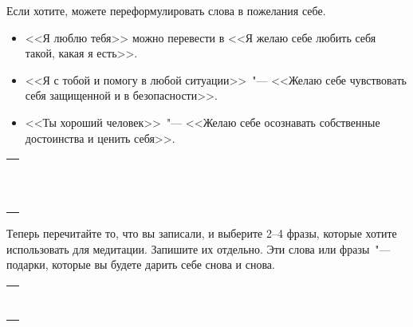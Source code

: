 \begin{itemize}
	\itemWritingHand Если хотите, можете переформулировать слова в пожелания себе.
	\begin{itemize}
		\item <<Я люблю тебя>> можно перевести в <<Я желаю себе любить себя такой, какая я есть>>.
		
		\item <<Я с тобой и помогу в любой ситуации>>~"--- <<Желаю себе чувствовать себя защищенной и в безопасности>>.
		
		\item <<Ты хороший человек>>~"--- <<Желаю себе осознавать собственные достоинства и ценить себя>>.
	\end{itemize}
\end{itemize}

\setlength{\extrarowheight}{2mm}
\begin{tabularx}{0.96\textwidth}{X}
	\\
	\arrayrulecolor{gray}\hline\\
	\hline\\
	\hline\\
	\hline\\
	\hline\\
	\hline\\
	\hline\\
	\hline\\
	\hline\\
	\hline\\
	\hline\\
	\hline\\
\end{tabularx}
\setlength{\extrarowheight}{0mm}
\begin{itemize}
	\itemWritingHand Теперь перечитайте то, что вы записали, и выберите 2--4 фразы, которые хотите использовать для медитации. Запишите их отдельно. Эти слова или фразы~"--- подарки, которые вы будете дарить себе снова и снова.
\end{itemize}

\setlength{\extrarowheight}{2mm}
\begin{tabularx}{0.96\textwidth}{X}
	\\
	\arrayrulecolor{gray}\hline\\
	\hline\\
	\hline\\
	\hline\\
	\hline\\
	\hline\\
	\hline\\
	\hline\\
\end{tabularx}
\setlength{\extrarowheight}{0mm}

